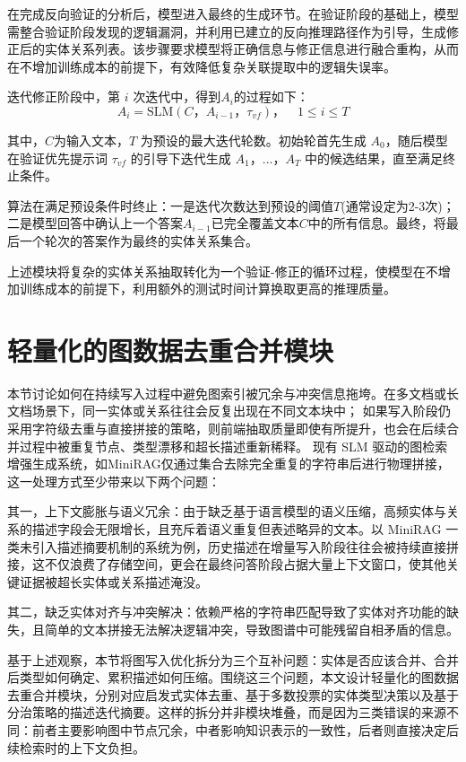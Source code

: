\documentclass[promaster, vlined]{DissertUESTC}
\begin{document}
在完成反向验证的分析后，模型进入最终的生成环节。在验证阶段的基础上，模型需整合验证阶段发现的逻辑漏洞，并利用已建立的反向推理路径作为引导，生成修正后的实体关系列表。该步骤要求模型将正确信息与修正信息进行融合重构，从而在不增加训练成本的前提下，有效降低复杂关联提取中的逻辑失误率。

迭代修正阶段中，第 $i$ 次迭代中，得到$A_i$的过程如下：
\begin{equation}
A_i = \text{SLM}(C， A_{i-1}， \tau_{vf})， \quad 1 \le i \le T
\end{equation}

其中，$C$为输入文本，$T$ 为预设的最大迭代轮数。初始轮首先生成 $A_0$，随后模型在验证优先提示词 $\tau_{vf}$ 的引导下迭代生成 $A_1，\dots，A_T$ 中的候选结果，直至满足终止条件。

算法在满足预设条件时终止：一是迭代次数达到预设的阈值$T$(通常设定为2-3次)；二是模型回答中确认上一个答案$A_{i-1}$已完全覆盖文本$C$中的所有信息。最终，将最后一个轮次的答案作为最终的实体关系集合。

上述模块将复杂的实体关系抽取转化为一个验证-修正的循环过程，使模型在不增加训练成本的前提下，利用额外的测试时间计算换取更高的推理质量。

\section{轻量化的图数据去重合并模块}
本节讨论如何在持续写入过程中避免图索引被冗余与冲突信息拖垮。在多文档或长文档场景下，同一实体或关系往往会反复出现在不同文本块中；
如果写入阶段仍采用字符级去重与直接拼接的策略，则前端抽取质量即使有所提升，也会在后续合并过程中被重复节点、类型漂移和超长描述重新稀释。
现有 SLM 驱动的图检索增强生成系统，如MiniRAG仅通过集合去除完全重复的字符串后进行物理拼接，这一处理方式至少带来以下两个问题：

其一，上下文膨胀与语义冗余：由于缺乏基于语言模型的语义压缩，高频实体与关系的描述字段会无限增长，且充斥着语义重复但表述略异的文本。以 MiniRAG 一类未引入描述摘要机制的系统为例，历史描述在增量写入阶段往往会被持续直接拼接，这不仅浪费了存储空间，更会在最终问答阶段占据大量上下文窗口，使其他关键证据被超长实体或关系描述淹没。

其二，缺乏实体对齐与冲突解决：依赖严格的字符串匹配导致了实体对齐功能的缺失，且简单的文本拼接无法解决逻辑冲突，导致图谱中可能残留自相矛盾的信息。

基于上述观察，本节将图写入优化拆分为三个互补问题：实体是否应该合并、合并后类型如何确定、累积描述如何压缩。围绕这三个问题，本文设计轻量化的图数据去重合并模块，分别对应启发式实体去重、基于多数投票的实体类型决策以及基于分治策略的描述迭代摘要。这样的拆分并非模块堆叠，而是因为三类错误的来源不同：前者主要影响图中节点冗余，中者影响知识表示的一致性，后者则直接决定后续检索时的上下文负担。
\end{document}
